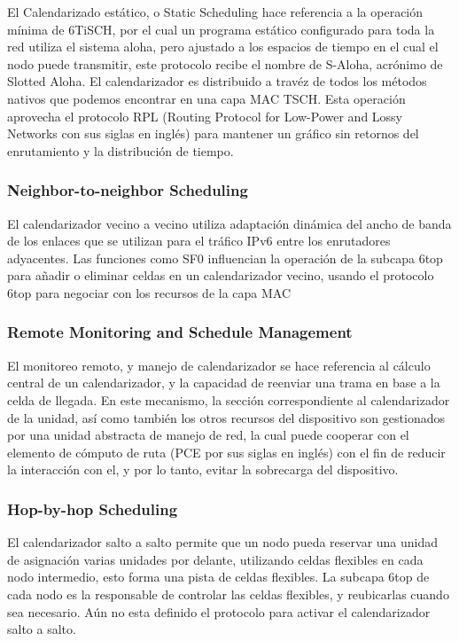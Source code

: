 El Calendarizado estático, o Static Scheduling hace referencia a la operación mínima de 6TiSCH, por el cual un programa estático configurado para toda la red utiliza el sistema aloha, pero ajustado a los espacios de tiempo en el cual el nodo puede transmitir, este protocolo recibe el nombre de S-Aloha, acrónimo de Slotted Aloha. El calendarizador es distribuido a travéz de todos los métodos nativos que podemos encontrar en una capa MAC TSCH. Esta operación aprovecha el protocolo RPL (Routing Protocol for Low-Power and Lossy Networks con sus siglas en inglés) para mantener un gráfico sin retornos del enrutamiento y la distribución de tiempo.


\subsubsection{Neighbor-to-neighbor Scheduling}

El calendarizador vecino a vecino utiliza adaptación dinámica del ancho de banda de los enlaces que se utilizan para el tráfico IPv6 entre los enrutadores adyacentes. Las funciones como SF0 influencian la operación de la subcapa 6top para añadir o eliminar celdas en un calendarizador vecino, usando el protocolo 6top para negociar con los recursos de la capa MAC

\subsubsection{Remote Monitoring and Schedule Management}

El monitoreo remoto, y manejo de calendarizador se hace referencia al cálculo central de un calendarizador, y la capacidad de reenviar una trama en base a la celda de llegada. En este mecanismo, la sección correspondiente al calendarizador de la unidad, así como también los otros recursos del dispositivo son gestionados por una unidad abstracta de manejo de red, la cual puede cooperar con el elemento de cómputo de ruta (PCE por sus siglas en inglés) con el fin de reducir la interacción con el, y por lo tanto, evitar la sobrecarga del dispositivo.

\subsubsection{Hop-by-hop Scheduling}

El calendarizador salto a salto permite que un nodo pueda reservar una unidad de asignación varias unidades por delante, utilizando celdas flexibles en cada nodo intermedio, esto forma una pista de celdas flexibles. La subcapa 6top de cada nodo es la responsable de controlar las celdas flexibles, y reubicarlas cuando sea necesario. Aún no esta definido el protocolo para activar el calendarizador salto a salto.

